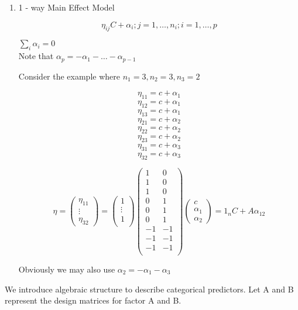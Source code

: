 \documentclass[11pt,fleqn]{book} %
\begin{document}
	\begin{enumerate}
		\item 1 - way Main Effect Model 

				$$\eta_{ij} C + \alpha_i; j = 1, \dots, n_i; i = 1, \dots, p $$ 

		$\sum_i \alpha_i = 0$\\

		Note that $\alpha_p = - \alpha_1 - \dots - \alpha_{p-1}$

Consider the example where $n_1 = 3, n_2 = 3, n_3 = 2$

		$$\eta_{11} = c + \alpha_1 $$
		$$\eta_{12} = c + \alpha_1 $$
		$$\eta_{13} = c + \alpha_1 $$
		$$\eta_{21} = c + \alpha_2 $$
		$$\eta_{22} = c + \alpha_2 $$
		$$\eta_{23} = c + \alpha_2 $$
		$$\eta_{31} = c + \alpha_3 $$
		$$\eta_{32} = c + \alpha_3 $$
		


		$$ \eta = \begin{pmatrix}
			\eta_{11}\\
			\vdots\\
			\eta_{32}
		\end{pmatrix} = \begin{pmatrix}
			1\\
			\vdots\\
			1\\
		\end{pmatrix} \begin{pmatrix}
			1 & 0 \\
			1 & 0 \\
			1 & 0 \\
			0 & 1 \\
			0 & 1 \\
			0 & 1 \\
			-1 & -1 \\
			-1 & -1 \\
			-1 & -1 \\
		\end{pmatrix}\begin{pmatrix}
			c\\
			\alpha_1 \\
			\alpha_2
		\end{pmatrix} = 1_n C + A \alpha_{12}$$

Obviously we may also use $\alpha_2 = -\alpha_1 - \alpha_3 $
	\end{enumerate}


	We introduce algebraic structure to describe categorical predictors. Let A and B represent the design matrices for factor A and B. 
\end{document}
